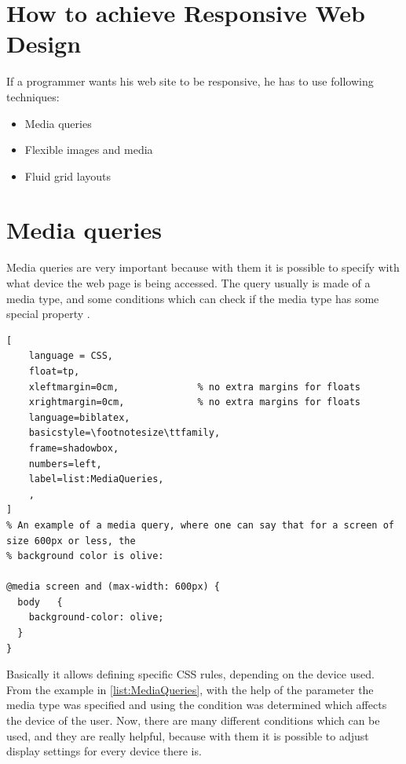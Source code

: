   



\section{How to achieve Responsive Web Design}

If a programmer wants his web site to be responsive, he has to use
following techniques:

\begin{itemize}
    \item Media queries
    \item Flexible images and media
    \item Fluid grid layouts
\end{itemize}


\section{Media queries}

Media queries are very important because with them it is possible to
specify with what device the web page is being accessed. The query
usually is made of a media type, and some conditions which can check if
the media type has some special property \parencite{A.A.Mohamed}.



\begin{lstlisting}[
    language = CSS, 
    float=tp,
    xleftmargin=0cm,              % no extra margins for floats
    xrightmargin=0cm,             % no extra margins for floats
    language=biblatex,
    basicstyle=\footnotesize\ttfamily,
    frame=shadowbox,
    numbers=left,
    label=list:MediaQueries,
    ,
]
% An example of a media query, where one can say that for a screen of size 600px or less, the 
% background color is olive:

@media screen and (max-width: 600px) {
  body   {
    background-color: olive;
  }
}
\end{lstlisting}



Basically it allows defining specific CSS rules, depending on the device
used. From the example in \ref{list:MediaQueries}, with the help of the parameter
 the media type was specified and using 
the condition was determined which affects the device of the user. Now,
there are many different conditions which can be used, and they are
really helpful, because with them it is possible to adjust display
settings for every device there is.

